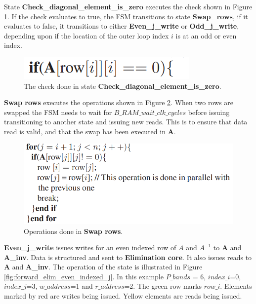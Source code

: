 State \textbf{Check\_diagonal\_element\_is\_zero} executes the check shown in Figure \ref{fig:check_diagonal_element}. If the check evaluates to true, the FSM transitions to state \textbf{Swap\_rows}, if it evaluates to false, it transitions to either \textbf{Even\_j\_write} or \textbf{Odd\_j\_write}, depending upon if the location of the outer loop index $i$ is at an odd or even index. 
\begin{figure}[H]
\centering
   \includegraphics[scale=0.8]{images/inverse_fsms/forward_elim/check_diagonal_element_is_zero.png}
  \caption{The check done in state \textbf{Check\_diagonal\_element\_is\_zero}.  } 
  \label{fig:check_diagonal_element}
\end{figure}

\textbf{Swap rows} executes the operations shown in Figure \ref{fig:swap_rows}. When two rows are swapped the FSM needs to wait for $B\_RAM\_wait\_clk\_cycles$ before issuing transitioning to another state and issuing new reads. This is to ensure that data read is valid, and that the swap has been executed in \textbf{A}. 

\begin{figure}[H]
\centering
   \includegraphics[scale=0.68]{images/inverse_fsms/forward_elim/swap_rows.png}
  \caption{Operations done in \textbf{Swap rows}.  } 
  \label{fig:swap_rows}
\end{figure}

\textbf{Even\_j\_write} issues writes for an even indexed row of $A$ and $A^{-1}$ to \textbf{A} and \textbf{A\_inv}. Data is structured and sent to \textbf{Elimination core}. It also issues reads to \textbf{A} and \textbf{A\_inv}. The operation of the state is illustrated in Figure \ref{fig:forward_elim_even_indexed_j}. In this example $P\_bands$ = 6, $index\_i$=0, $index\_j$=3, $w\_address$=1 and $r\_address$=2. The green row marks $row\_i$. Elements marked by red are writes being issued. Yellow elements are reads being issued. 

